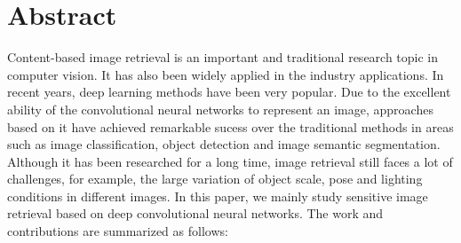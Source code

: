 
\chapter*{Abstract}
Content-based image retrieval is an important and traditional research topic in computer vision. It has also been widely applied in the industry applications. In recent years, deep learning methods have been very popular. Due to the excellent ability of the convolutional neural networks to represent an image, approaches based on it have achieved remarkable sucess over the traditional methods in areas such as image classification, object detection and image semantic segmentation. Although it has been researched for a long time, image retrieval still faces a lot of challenges, for example, the large variation of object scale, pose and lighting conditions in different images. In this paper, we mainly study sensitive image retrieval based on deep convolutional neural networks. The work and contributions are summarized as follows:

